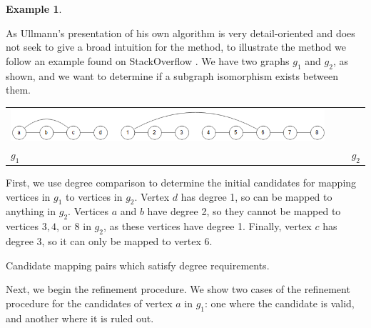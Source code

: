 \documentclass[12pt]{thesis}
\theoremstyle{plain}
\theoremstyle{definition}
\newtheorem{example}[theorem]{Example}
\theoremstyle{remark}
\begin{document}
\begin{example}\label{ex:ullmann}

As Ullmann's presentation of his own algorithm is very detail-oriented and does not seek to give a broad intuition for the method, to illustrate the method we follow an example found on StackOverflow \cite{ullmannStackOverflow}. We have two graphs $g_1$ and $g_2$, as shown, and we want to determine if a subgraph isomorphism exists between them.


\vspace{-30pt}
\begin{center}
\begin{tabular}{C{0.35\textwidth}C{0.6\textwidth}}
\includegraphics[width=0.95\textwidth]{ullmann_demo_cropped.png} & \\ $g_1$ & $g_2$\\
\end{tabular}
\end{center}

First, we use degree comparison to determine the initial candidates for mapping vertices in $g_1$ to vertices in $g_2$. Vertex $d$ has degree 1, so can be mapped to anything in $g_2$. Vertices $a$ and $b$ have degree 2, so they cannot be mapped to vertices $3, 4$, or $8$ in $g_2$, as these vertices have degree 1. Finally, vertex $c$ has degree 3, so it can only be mapped to vertex 6.

\begin{center}
\footnotesize\singlespacing Candidate mapping pairs which satisfy degree requirements.
\end{center}
\vspace{-5pt}

Next, we begin the refinement procedure. We show two cases of the refinement procedure for the candidates of vertex $a$ in $g_1$: one where the candidate is valid, and another where it is ruled out.


\end{example}
\end{document}

